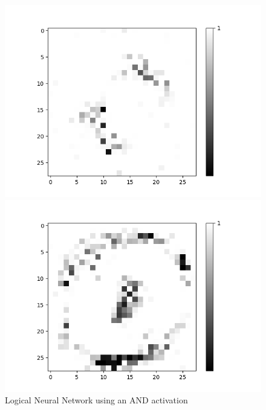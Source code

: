 \documentclass[]{beamer}
\begin{document}
\begin{frame}
\begin{minipage}[t]{0.4\textwidth}
\begin{figure}[H]
\begin{minipage}[b]{0.7\textwidth}
		\includegraphics[width=\textwidth]{Images/AND(LSM)/Positive/Layer0-Neuron-0.png}
	\end{minipage}
	
	\medskip

	\begin{minipage}[b]{0.7\textwidth}
		\captionsetup{labelformat=empty}
		\includegraphics[width=\textwidth]{Images/AND(LSM)/Negative/Layer0-Neuron-0.png}
	\end{minipage}
	\caption{Logical Neural Network using an AND activation}
	\hfill
\end{figure}
\end{minipage}

\end{frame}
\end{document}
